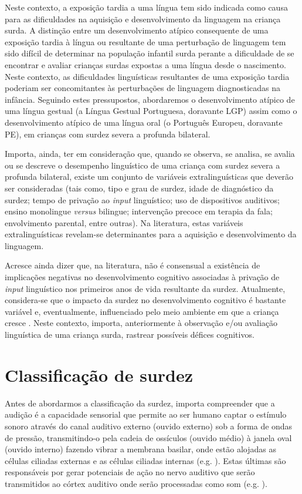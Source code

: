 \documentclass[output=paper,colorlinks,citecolor=brown,booklanguage=portuguese]{langscibook}
\begin{document}
Neste contexto, a exposição tardia a uma língua tem sido indicada como causa para as dificuldades na aquisição e desenvolvimento da linguagem na criança surda. A distinção entre um desenvolvimento atípico consequente de uma exposição tardia à língua ou resultante de uma perturbação de linguagem tem sido difícil de determinar na população infantil surda perante a dificuldade de se encontrar e avaliar crianças surdas expostas a uma língua desde o nascimento. Neste contexto, as dificuldades linguísticas resultantes de uma exposição tardia poderiam ser concomitantes às perturbações de linguagem diagnosticadas na infância. Seguindo estes pressupostos, abordaremos o desenvolvimento atípico de uma língua gestual (a Língua Gestual Portuguesa, doravante LGP) assim como o desenvolvimento atípico de uma língua oral (o Português Europeu, doravante PE), em crianças com surdez severa a profunda bilateral.

Importa, ainda, ter em consideração que, quando se observa, se analisa, se avalia ou se descreve o desempenho linguístico de uma criança com surdez severa a profunda bilateral, existe um conjunto de variáveis extralinguísticas que deverão ser consideradas (tais como, tipo e grau de surdez, idade de diagnóstico da surdez; tempo de privação ao \emph{input} linguístico; uso de dispositivos auditivos; ensino monolingue \emph{versus} bilingue; intervenção precoce em terapia da fala; envolvimento parental, entre outras). Na literatura, estas variáveis extralinguísticas revelam-se determinantes para a aquisição e desenvolvimento da linguagem.

Acresce ainda dizer que, na literatura, não é consensual a existência de implicações negativas no desenvolvimento cognitivo associadas à privação de \emph{input} linguístico nos primeiros anos de vida resultante da surdez. Atualmente, considera-se que o impacto da surdez no desenvolvimento cognitivo é bastante variável e, eventualmente, influenciado pelo meio ambiente em que a criança cresce \citep{Cardoso2009, Hall2019}. Neste contexto, importa, anteriormente à observação e/ou avaliação linguística de uma criança surda, rastrear possíveis défices cognitivos.

\section{Classificação de surdez}
Antes de abordarmos a classificação da surdez, importa compreender que a audição é a capacidade sensorial que permite ao ser humano captar o estímulo sonoro através do canal auditivo externo (ouvido externo) sob a forma de ondas de pressão, transmitindo-o pela cadeia de ossículos (ouvido médio) à janela oval (ouvido interno) fazendo vibrar a membrana basilar, onde estão alojadas as células ciliadas externas e as células ciliadas internas (e.g. \citealp{Rego2017}). Estas últimas são responsáveis por gerar potenciais de ação no nervo auditivo que serão transmitidos ao córtex auditivo onde serão processadas como som (e.g. \citealp{Oliveira1993}).
\end{document}
